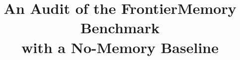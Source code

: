 \documentclass[conference]{IEEEtran}
\begin{document}
\title{An Audit of the FrontierMemory Benchmark\\with a No-Memory Baseline}
\author{}
\maketitle











\end{document}
